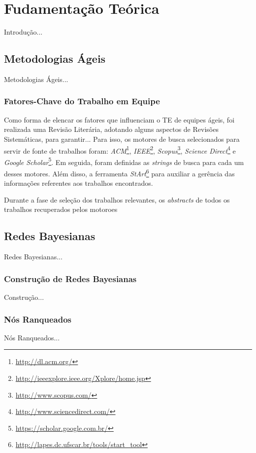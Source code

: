 \chapter{Fudamentação Teórica}
\label{fundamentacao}

{\color{red} Introdução...}

\section{Metodologias Ágeis}
\label{fundamentacao:ageis}

{\color{red} Metodologias Ágeis...}

\subsection{Fatores-Chave do Trabalho em Equipe}
\label{fundamentacao:ageis:fatores}

Como forma de elencar os fatores que influenciam o TE de equipes ágeis, foi realizada uma Revisão Literária, adotando alguns aspectos de Revisões Sistemáticas, para garantir... Para isso, os motores de busca selecionados para servir de fonte de trabalhos foram: \textit{ACM}\footnote{\url{http://dl.acm.org/}}, \textit{IEEE}\footnote{\url{http://ieeexplore.ieee.org/Xplore/home.jsp}}, \textit{Scopus}\footnote{\url{http://www.scopus.com/}}, \textit{Science Direct}\footnote{\url{http://www.sciencedirect.com/}} e \textit{Google Scholar}\footnote{\url{https://scholar.google.com.br/}}. Em seguida, foram definidas as \textit{strings} de busca para cada um desses motores. Além disso, a ferramenta \textit{StArt}\footnote{\url{http://lapes.dc.ufscar.br/tools/start_tool}} para auxiliar a gerência das informações referentes aos trabalhos encontrados.

Durante a fase de seleção dos trabalhos relevantes, os \textit{abstracts} de todos os trabalhos recuperados pelos motoroes

\section{Redes Bayesianas}
\label{fundamentacao:redes}

{\color{red} Redes Bayesianas...}

\subsection{Construção de Redes Bayesianas}
\label{fundamentacao:redes:construcao}

{\color{red} Construção...}

\subsection{Nós Ranqueados}
\label{fundamentacao:nos}

{\color{red} Nós Ranqueados...}
